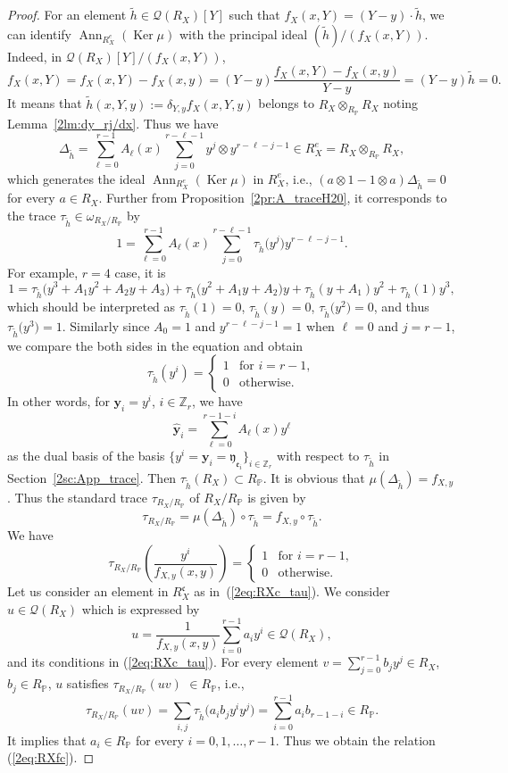 \documentclass[10pt,a4paper]{amsart}
\def\ZZ{{\mathbb Z}}
\def\PP{{\mathbb P}}
\def\bby{{\mathbf y}}
\def\cQ{{\mathcal Q}}
\def\fc{{\mathfrak c}}
\def\fe{{\mathfrak e}}
\def\fy{{\mathfrak y}}
\def\th{{\widetilde h}}
\def\hby{\widehat {{\mathbf y}}}
\def\Ker{\operatorname{Ker}}
\def\Ann{\operatorname{Ann}}
\numberwithin{equation}{section}
\begin{document}
\begin{proof}
For an element $\th \in \cQ(R_X)[Y]$ such that $f_X(x,Y)=(Y-y) \cdot \th$,
we can identify $\Ann_{R_X^e}(\Ker \mu)$ with the principal ideal $(\th)/(f_X(x,Y))$.
Indeed, in $\cQ(R_X)[Y]/(f_X(x,Y))$,
\[
f_X(x,Y) = f_X(x,Y)-f_X(x,y) = (Y-y)\frac{f_X(x,Y)-f_X(x,y)}{Y-y}=(Y-y)\th=0.
\]
It means that $\th(x,Y,y):=\delta_{Y,y} f_X(x,Y,y)$ belongs to $R_X\otimes_{R_\PP} R_X$ noting Lemma~\ref{2lm:dy_rj/dx}.
Thus we have
\[
\Delta_{\th}=\sum_{\ell=0}^{r-1}A_\ell(x)\sum_{j=0}^{r-\ell-1}
y^{j}\otimes y^{r-\ell-j-1} \in R_X^e=R_X \otimes_{R_\PP} R_X,
\]
which generates the ideal $\Ann_{R_X^e}(\Ker \mu)$ in $R_X^e$, i.e.,
$(a\otimes 1-1\otimes a) \Delta_{\th}=0$ for every $a\in R_X$.
Further from Proposition~\ref{2pr:A_traceH20}, it corresponds to the trace $\tau_\th\in \omega_{R_X/R_\PP}$ by
\[
1=\sum_{\ell=0}^{r-1}A_\ell(x)
\sum_{j=0}^{r-\ell-1}\tau_\th\big(y^{j}\big)y^{r-\ell-j-1}.
\]
For example, $r=4$ case, it is
\[
1=\tau_\th\big(y^3 + A_1 y^2 + A_2 y+ A_3\big) +
\tau_\th\big(y^2 + A_1 y + A_2\big)y +
\tau_\th(y + A_1)y^2+\tau_\th(1)y^3,
\]
which should be interpreted as $\tau_\th(1)=0$, $\tau_\th(y)=0$, $\tau_\th\big(y^2\big)=0$, and thus $\tau_\th\big(y^3\big)=1$.
Similarly since $A_0=1$ and $y^{r-\ell-j-1}=1$ when $\ell=0$ and $j=r-1$, we compare the both sides in the equation and obtain
\[
\tau_\th(y^i) =
\begin{cases}
1 & \text{for } i=r-1,\\
0 & \text{otherwise}.
\end{cases}
\]
In other words, for $\bby_i = y^i$, $i\in \ZZ_r$, we have
\[
\hby_i = \sum_{\ell=0}^{r-1-i}A_\ell(x)y^{\ell}
\]
as the dual basis of the basis $\{y^i =\bby_i = \fy_{\fe_i}\}_{i\in \ZZ_r}$ with respect to $\tau_\th$ in Section~\ref{2sc:App_trace}.
Then $\tau_\th(R_X) \subset R_\PP$. It is obvious that $\mu(\Delta_{\th})= f_{X,y}$.
Thus the standard trace $\tau_{R_X/R_\PP}$ of $R_X/R_\PP$ is given by
\[
\tau_{R_X/R_\PP}=\mu(\Delta_\th)\circ \tau_\th=
 f_{X,y}\circ \tau_\th.
\]
We have
\[
\tau_{R_X/R_\PP}
\left(\frac{y^i}{ f_{X,y}(x,y)}\right)
= \begin{cases}
1 & \text{for } i=r-1,\\
0 & \text{otherwise}.
\end{cases}
\]
Let us consider an element in $R_{X}^{\fc}$ as in~(\ref{2eq:RXc_tau}).
We consider $u \in \cQ(R_X)$ which is expressed by
\[
u = \frac{1}{f_{X,y}(x,y)} \sum_{i=0}^{r-1} a_i y^i \in \cQ(R_X),
\]
and its conditions in (\ref{2eq:RXc_tau}).
For every element $v = \sum_{j=0}^{r-1} b_j y^j \in R_X$, $b_j \in R_\PP$, $u$ satisfies $\tau_{R_X/R_\PP}(u v)$ $ \in R_\PP$, i.e.,
\[
\tau_{R_X/R_\PP}(u v)= \sum_{i,j} \tau_\th\big(a_i b_j y^i y^j\big)= \sum_{i=0}^{r-1} a_i b_{r-1-i}\in R_\PP.
\]
It implies that $a_i \in R_\PP$ for every $i=0, 1, \dots, r-1$.
Thus we obtain the relation (\ref{2eq:RXfc}).
\end{proof}
\end{document}
